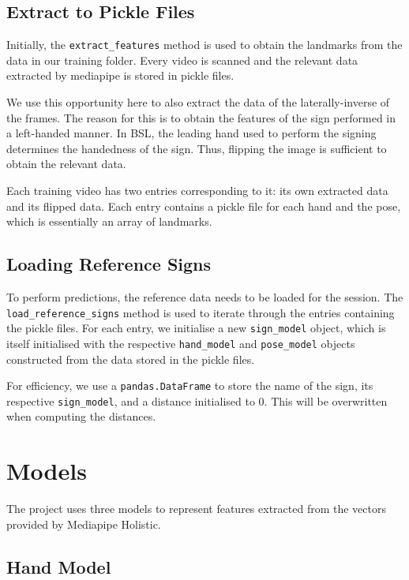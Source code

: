 \documentclass[final,dissertation.tex]{subfiles}
\begin{document}
\subsection{Extract to Pickle Files}

Initially, the \verb|extract_features| method is used to obtain the landmarks from the data in our training folder. Every video is scanned and the relevant data extracted by mediapipe is stored in pickle files.

We use this opportunity here to also extract the data of the laterally-inverse of the frames. The reason for this is to obtain the features of the sign performed in a left-handed manner. In BSL, the leading hand used to perform the signing determines the handedness of the sign. Thus, flipping the image is sufficient to obtain the relevant data.

Each training video has two entries corresponding to it: its own extracted data and its flipped data. Each entry contains a pickle file for each hand and the pose, which is essentially an array of landmarks.

\subsection{Loading Reference Signs}

To perform predictions, the reference data needs to be loaded for the session. The \verb|load_reference_signs| method is used to iterate through the entries containing the pickle files. For each entry, we initialise a new \verb|sign_model| object, which is itself initialised with the respective \verb|hand_model| and \verb|pose_model| objects constructed from the data stored in the pickle files.

For efficiency, we use a \verb|pandas.DataFrame| to store the name of the sign, its respective \verb|sign_model|, and a distance initialised to 0. This will be overwritten when computing the distances.

\section{Models}

The project uses three models to represent features extracted from the vectors provided by Mediapipe Holistic.

\subsection*{Hand Model}
\end{document}
